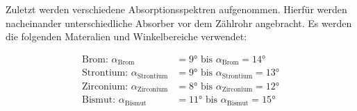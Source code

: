 Zuletzt werden verschiedene Absorptionsspektren aufgenommen. Hierfür werden nacheinander unterschiedliche Absorber vor dem Zählrohr angebracht. Es werden die folgenden Materalien und Winkelbereiche verwendet:

\begin{equation}
\begin{aligned}
\text{Brom:}  \,\, \alpha_{\text{Brom}} &= 9°  \,\, \text{bis} \,\, \alpha_{\text{Brom}} = 14° \\
\text{Strontium:} \,\,  \alpha_{\text{Strontium}} &= 9°  \,\, \text{bis} \,\,   \alpha_{\text{Strontium}} = 13° \\
\text{Zirconium:}  \,\, \alpha_{\text{Zirconium}} &= 8°  \,\, \text{bis} \,\,   \alpha_{\text{Zirconium}} = 12° \\
\text{Bismut:} \,\,  \alpha_{\text{Bismut}} &= 11°  \,\, \text{bis} \,\,   \alpha_{\text{Bismut}} = 15° \\
\end{aligned}
\end{equation} 